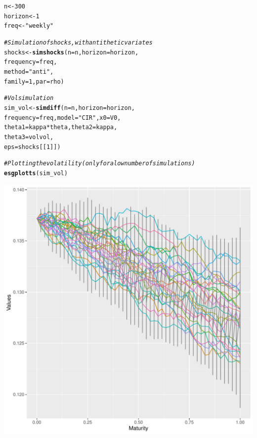 \documentclass[a4paper]{article}\usepackage[]{graphicx}\usepackage[]{color}
\makeatletter
\def\maxwidth{ %
  \ifdim\Gin@nat@width>\linewidth
    \linewidth
  \else
    \Gin@nat@width
  \fi
}
\newcommand{\hlnum}[1]{\textcolor[rgb]{0.686,0.059,0.569}{#1}}%
\newcommand{\hlstr}[1]{\textcolor[rgb]{0.192,0.494,0.8}{#1}}%
\newcommand{\hlcom}[1]{\textcolor[rgb]{0.678,0.584,0.686}{\textit{#1}}}%
\newcommand{\hlopt}[1]{\textcolor[rgb]{0,0,0}{#1}}%
\newcommand{\hlstd}[1]{\textcolor[rgb]{0.345,0.345,0.345}{#1}}%
\newcommand{\hlkwb}[1]{\textcolor[rgb]{0.69,0.353,0.396}{#1}}%
\newcommand{\hlkwc}[1]{\textcolor[rgb]{0.333,0.667,0.333}{#1}}%
\newcommand{\hlkwd}[1]{\textcolor[rgb]{0.737,0.353,0.396}{\textbf{#1}}}%
\newenvironment{kframe}{%
 \def\at@end@of@kframe{}%
 \ifinner\ifhmode%
  \def\at@end@of@kframe{\end{minipage}}%
  \begin{minipage}{\columnwidth}%
 \fi\fi%
 \def\FrameCommand##1{\hskip\@totalleftmargin \hskip-\fboxsep
 \colorbox{shadecolor}{##1}\hskip-\fboxsep
     \hskip-\linewidth \hskip-\@totalleftmargin \hskip\columnwidth}%
 \MakeFramed {\advance\hsize-\width
   \@totalleftmargin\z@ \linewidth\hsize
   \@setminipage}}%
 {\par\unskip\endMakeFramed%
 \at@end@of@kframe}
\newenvironment{knitrout}{}{} %
\makeatother
\begin{document}
\begin{knitrout}
\color{fgcolor}\begin{kframe}
\begin{alltt}
\hlstd{n} \hlkwb{<-} \hlnum{300}
\hlstd{horizon} \hlkwb{<-} \hlnum{1}
\hlstd{freq} \hlkwb{<-} \hlstr{"weekly"}

\hlcom{# Simulation of shocks, with antithetic variates}
\hlstd{shocks} \hlkwb{<-} \hlkwd{simshocks}\hlstd{(}\hlkwc{n} \hlstd{= n,} \hlkwc{horizon} \hlstd{= horizon,}
          \hlkwc{frequency} \hlstd{= freq,}
          \hlkwc{method} \hlstd{=} \hlstr{"anti"}\hlstd{,}
          \hlkwc{family} \hlstd{=} \hlnum{1}\hlstd{,} \hlkwc{par} \hlstd{= rho)}

\hlcom{# Vol simulation}
\hlstd{sim_vol} \hlkwb{<-} \hlkwd{simdiff}\hlstd{(}\hlkwc{n} \hlstd{= n,} \hlkwc{horizon} \hlstd{= horizon,}
                   \hlkwc{frequency} \hlstd{= freq,} \hlkwc{model} \hlstd{=} \hlstr{"CIR"}\hlstd{,} \hlkwc{x0} \hlstd{= V0,}
                   \hlkwc{theta1} \hlstd{= kappa}\hlopt{*}\hlstd{theta,} \hlkwc{theta2} \hlstd{= kappa,}
                   \hlkwc{theta3} \hlstd{= volvol,}
                    \hlkwc{eps} \hlstd{= shocks[[}\hlnum{1}\hlstd{]])}

\hlcom{# Plotting the volatility (only for a low number of simulations)}
\hlkwd{esgplotts}\hlstd{(sim_vol)}
\end{alltt}
\end{kframe}
\includegraphics[width=\maxwidth]{figure/_example_SVJD_2-1} 

\end{knitrout}
\end{document}
